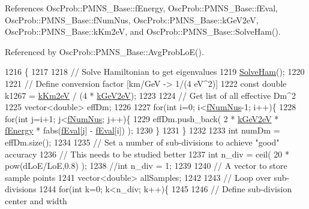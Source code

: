 References Osc\+Prob\+::\+P\+M\+N\+S\+\_\+\+Base\+::f\+Energy, Osc\+Prob\+::\+P\+M\+N\+S\+\_\+\+Base\+::f\+Eval, Osc\+Prob\+::\+P\+M\+N\+S\+\_\+\+Base\+::f\+Num\+Nus, Osc\+Prob\+::\+P\+M\+N\+S\+\_\+\+Base\+::k\+Ge\+V2eV, Osc\+Prob\+::\+P\+M\+N\+S\+\_\+\+Base\+::k\+Km2eV, and Osc\+Prob\+::\+P\+M\+N\+S\+\_\+\+Base\+::\+Solve\+Ham().



Referenced by Osc\+Prob\+::\+P\+M\+N\+S\+\_\+\+Base\+::\+Avg\+Prob\+Lo\+E().


\begin{DoxyCode}
1216 \{
1217 
1218   \textcolor{comment}{// Solve Hamiltonian to get eigenvalues}
1219   \hyperlink{classOscProb_1_1PMNS__Base_a91f065cb9e910e0095e41462b4420b01}{SolveHam}();
1220 
1221   \textcolor{comment}{// Define conversion factor [km/GeV -> 1/(4 eV^2)]}
1222   \textcolor{keyword}{const} \textcolor{keywordtype}{double} k1267 = \hyperlink{classOscProb_1_1PMNS__Base_a382ddd7b76ca89b43f22614a2ea7327b}{kKm2eV} / (4 * \hyperlink{classOscProb_1_1PMNS__Base_ad36a0a6bf58d6ec093d3947784bd89e9}{kGeV2eV});
1223 
1224   \textcolor{comment}{// Get list of all effective Dm^2}
1225   vector<double> effDm;
1226 
1227   \textcolor{keywordflow}{for}(\textcolor{keywordtype}{int} i=0; i<\hyperlink{classOscProb_1_1PMNS__Base_a24bb74bed63569dfe88b18fa6a08060e}{fNumNus}-1; i++)\{
1228     \textcolor{keywordflow}{for}(\textcolor{keywordtype}{int} j=i+1; j<\hyperlink{classOscProb_1_1PMNS__Base_a24bb74bed63569dfe88b18fa6a08060e}{fNumNus}; j++)\{
1229       effDm.push\_back( 2 * \hyperlink{classOscProb_1_1PMNS__Base_ad36a0a6bf58d6ec093d3947784bd89e9}{kGeV2eV} * \hyperlink{classOscProb_1_1PMNS__Base_a2800af6d436972f3e900867790c046b0}{fEnergy} * fabs(\hyperlink{classOscProb_1_1PMNS__Base_a6319c34d7decbb9d7d6da279c06e8c2d}{fEval}[j] - 
      \hyperlink{classOscProb_1_1PMNS__Base_a6319c34d7decbb9d7d6da279c06e8c2d}{fEval}[i]) );
1230     \}
1231   \}
1232 
1233   \textcolor{keywordtype}{int} numDm = effDm.size();
1234 
1235   \textcolor{comment}{// Set a number of sub-divisions to achieve "good" accuracy}
1236   \textcolor{comment}{// This needs to be studied better}
1237   \textcolor{keywordtype}{int} n\_div = ceil( 20 * pow(dLoE/LoE,0.8) );
1238   \textcolor{comment}{//int n\_div = 1;}
1239 
1240   \textcolor{comment}{// A vector to store sample points}
1241   vector<double> allSamples;
1242 
1243   \textcolor{comment}{// Loop over sub-divisions}
1244   \textcolor{keywordflow}{for}(\textcolor{keywordtype}{int} k=0; k<n\_div; k++)\{
1245 
1246     \textcolor{comment}{// Define sub-division center and width}

\end{DoxyCode}
